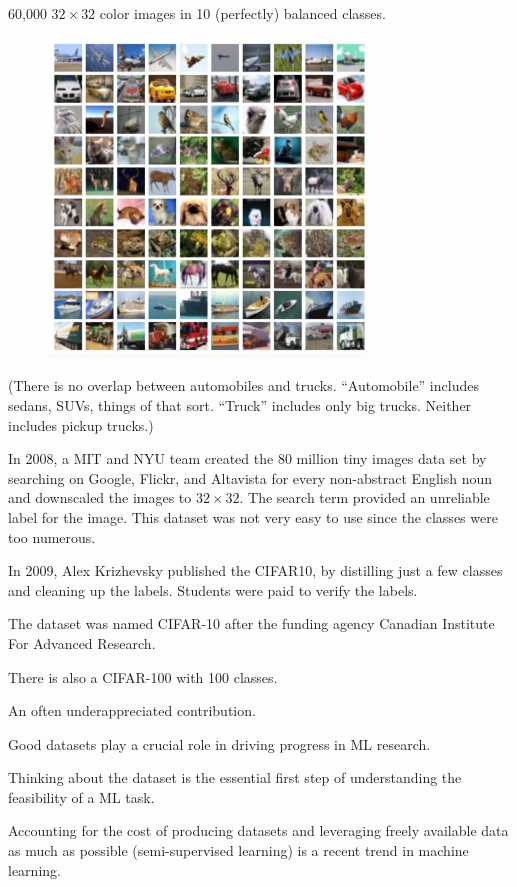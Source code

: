 \documentclass{report}
\begin{document}
\begin{concept}[3.21][CIFAR10]
    60,000 $32 \times 32$ color images in 10 (perfectly) balanced classes.

    \begin{figure}[H]
        \centering
        \includegraphics[width=0.75\textwidth]{.././assets/3.4.jpg}
    \end{figure}

    (There is no overlap between automobiles and trucks. “Automobile” includes sedans, SUVs, things of that sort. “Truck” includes only big trucks. Neither includes pickup trucks.)

    In 2008, a MIT and NYU team created the 80 million tiny images data set by searching on Google, Flickr, and Altavista for every non-abstract English noun and downscaled the images to $32 \times 32$. The search term provided an unreliable label for the image. This dataset was not very easy to use since the classes were too numerous.

    In 2009, Alex Krizhevsky published the CIFAR10, by distilling just a few classes and cleaning up the labels. Students were paid to verify the labels.

    The dataset was named CIFAR-10 after the funding agency Canadian Institute For Advanced Research.

    There is also a CIFAR-100 with 100 classes.
\end{concept}

\begin{concept}
    An often underappreciated contribution.

    Good datasets play a crucial role in driving progress in ML research.

    Thinking about the dataset is the essential first step of understanding the feasibility of a ML task.

    Accounting for the cost of producing datasets and leveraging freely available data as much as possible (semi-supervised learning) is a recent trend in machine learning.
\end{concept}
\end{document}
